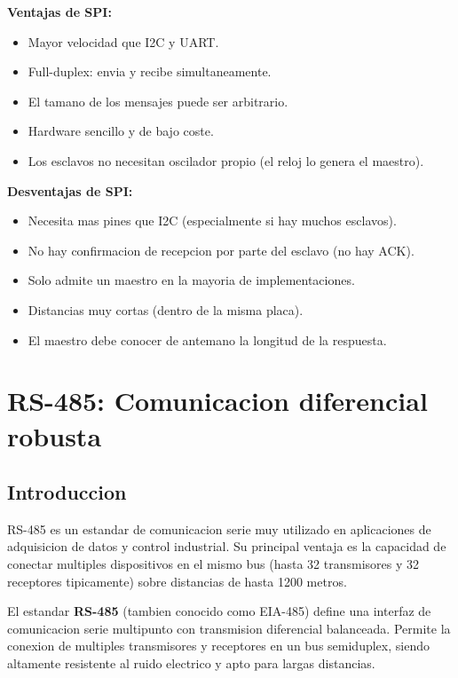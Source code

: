 \textbf{Ventajas de SPI:}
\begin{itemize}
    \item Mayor velocidad que I2C y UART.
    \item Full-duplex: envia y recibe simultaneamente.
    \item El tamano de los mensajes puede ser arbitrario.
    \item Hardware sencillo y de bajo coste.
    \item Los esclavos no necesitan oscilador propio (el reloj lo genera el maestro).
\end{itemize}

\textbf{Desventajas de SPI:}
\begin{itemize}
    \item Necesita mas pines que I2C (especialmente si hay muchos esclavos).
    \item No hay confirmacion de recepcion por parte del esclavo (no hay ACK).
    \item Solo admite un maestro en la mayoria de implementaciones.
    \item Distancias muy cortas (dentro de la misma placa).
    \item El maestro debe conocer de antemano la longitud de la respuesta.
\end{itemize}


\section{RS-485: Comunicacion diferencial robusta}

\subsection{Introduccion}

RS-485 es un estandar de comunicacion serie muy utilizado en aplicaciones de
adquisicion de datos y control industrial. Su principal ventaja es la capacidad
de conectar multiples dispositivos en el mismo bus (hasta 32 transmisores y 32
receptores tipicamente) sobre distancias de hasta 1200 metros.

\begin{definicion}[RS-485]
El estandar \textbf{RS-485} (tambien conocido como EIA-485) define una interfaz
de comunicacion serie multipunto con transmision diferencial balanceada. Permite
la conexion de multiples transmisores y receptores en un bus semiduplex, siendo
altamente resistente al ruido electrico y apto para largas distancias.
\end{definicion}

